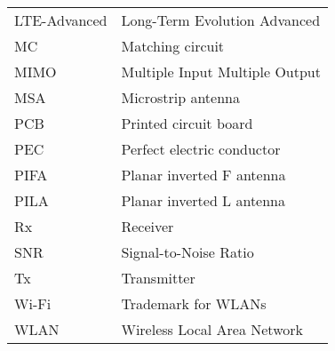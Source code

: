 \begin{tabular}{ll}
LTE-Advanced & Long-Term Evolution Advanced\\
MC          & Matching circuit\\
MIMO        & Multiple Input Multiple Output \\
MSA         & Microstrip antenna\\
PCB         & Printed circuit board\\
PEC         & Perfect electric conductor\\
PIFA        & Planar inverted F antenna\\
PILA        & Planar inverted L antenna\\
Rx          & Receiver \\
SNR         & Signal-to-Noise Ratio \\
Tx          & Transmitter \\
Wi-Fi       & Trademark for WLANs \\
WLAN        & Wireless Local Area Network \\
\end{tabular}
